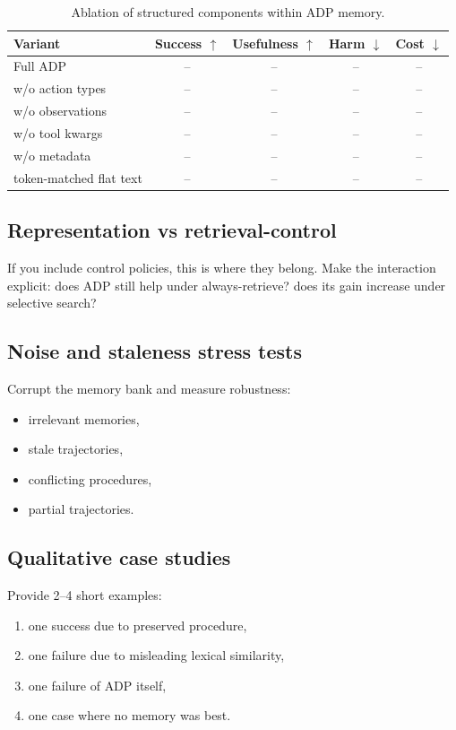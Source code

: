 \documentclass{article}
\newcommand{\ADP}{\textsc{ADP}}
\begin{document}
\begin{table}[t]
    \centering
    \small
    \caption{Ablation of structured components within \ADP{} memory.}
    \label{tab:ablations}
    \begin{tabular}{lcccc}
        \toprule
        Variant & Success $\uparrow$ & Usefulness $\uparrow$ & Harm $\downarrow$ & Cost $\downarrow$ \\
        \midrule
        Full \ADP{} & -- & -- & -- & -- \\
        w/o action types & -- & -- & -- & -- \\
        w/o observations & -- & -- & -- & -- \\
        w/o tool kwargs & -- & -- & -- & -- \\
        w/o metadata & -- & -- & -- & -- \\
        token-matched flat text & -- & -- & -- & -- \\
        \bottomrule
    \end{tabular}
\end{table}

\subsection{Representation vs retrieval-control}
If you include control policies, this is where they belong.
Make the interaction explicit:
does \ADP{} still help under always-retrieve?
does its gain increase under selective search?

\subsection{Noise and staleness stress tests}
Corrupt the memory bank and measure robustness:
\begin{itemize}[leftmargin=*,itemsep=2pt,topsep=2pt]
    \item irrelevant memories,
    \item stale trajectories,
    \item conflicting procedures,
    \item partial trajectories.
\end{itemize}

\subsection{Qualitative case studies}
Provide 2--4 short examples:
\begin{enumerate}[leftmargin=*,itemsep=2pt,topsep=2pt]
    \item one success due to preserved procedure,
    \item one failure due to misleading lexical similarity,
    \item one failure of \ADP{} itself,
    \item one case where no memory was best.
\end{enumerate}
\end{document}

